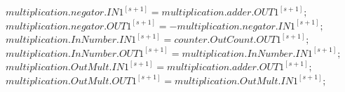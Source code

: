 \documentclass{article}
\begin{document}
\begin{appendices}
\(multiplication.negator.IN1^{[s+1]} = multiplication.adder.OUT1^{[s+1]};\)\\
\(multiplication.negator.OUT1^{[s+1]} = -multiplication.negator.IN1^{[s+1]};\)\\
\(multiplication.InNumber.IN1^{[s+1]} = counter.OutCount.OUT1^{[s+1]};\)\\
\(multiplication.InNumber.OUT1^{[s+1]} = multiplication.InNumber.IN1^{[s+1]};\)\\
\(multiplication.OutMult.IN1^{[s+1]} = multiplication.adder.OUT1^{[s+1]};\)\\
\(multiplication.OutMult.OUT1^{[s+1]} = multiplication.OutMult.IN1^{[s+1]};\)\\
\end{appendices}
\end{document}
